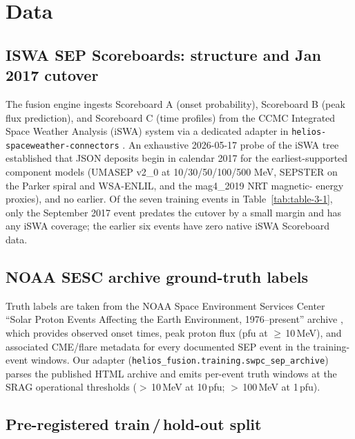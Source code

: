 \documentclass[11pt,letterpaper]{article}
\begin{document}
\section{Data}
\label{sec:data}

\subsection{ISWA SEP Scoreboards: structure and Jan 2017 cutover}
\label{sec:data:iswa}

The fusion engine ingests Scoreboard A (onset probability), Scoreboard B
(peak flux prediction), and Scoreboard C (time profiles) from the CCMC
Integrated Space Weather Analysis (iSWA) system \cite{ccmc_iswa,whitman2023,whitman2024}
via a dedicated adapter in \texttt{helios-spaceweather-connectors}
\cite{helios_connectors}.  An exhaustive 2026-05-17 probe of the iSWA tree
established that JSON deposits begin in calendar 2017 for the
earliest-supported component models (UMASEP v2\_0 at 10/30/50/100/500 MeV,
SEPSTER on the Parker spiral and WSA-ENLIL, and the mag4\_2019 NRT magnetic-
energy proxies), and no earlier.  Of the seven training events in
Table~\ref{tab:table-3-1}, only the September 2017 event predates the
cutover by a small margin and has any iSWA coverage; the earlier six events
have zero native iSWA Scoreboard data.

\subsection{NOAA SESC archive ground-truth labels}
\label{sec:data:sesc}

Truth labels are taken from the NOAA Space Environment Services Center
``Solar Proton Events Affecting the Earth Environment, 1976--present''
archive \cite{noaa_sesc}, which provides observed onset times, peak proton
flux (pfu at $\ge$\,10\,MeV), and associated CME/flare metadata for every
documented SEP event in the training-event windows.  Our adapter
(\texttt{helios\_fusion.training.swpc\_sep\_archive}) parses the published
HTML archive and emits per-event truth windows at the SRAG operational
thresholds ($>$\,10\,MeV at 10\,pfu; $>$\,100\,MeV at 1\,pfu).

\subsection{Pre-registered train\,/\,hold-out split}
\label{sec:data:split}


\end{document}
